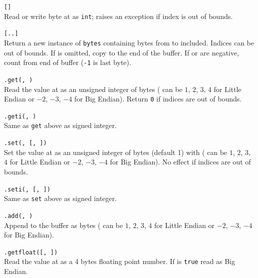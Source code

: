 \hangpar {}\texttt{[}\texttt{]} \\
Read or write byte at  as \texttt{int}; raises an exception if index is out of bounds.

\hangpar {}\texttt{[}\texttt{..}\texttt{]} \\
Return a new instance of \texttt{bytes} containing bytes from  to  included. Indices can be out of bounds. If  is omitted, copy to the end of the buffer. If  or  are negative, count from end of buffer (\texttt{-1} is last byte).

\hangpar {}\texttt{.get(}\texttt{, }\texttt{)} \\
Read the value at  as an unsigned integer of  bytes ( can be $1$, $2$, $3$, $4$ for Little Endian or $-2$, $-3$, $-4$ for Big Endian). Return \texttt{0} if indices are out of bounds.

\hangpar {}\texttt{.geti(}\texttt{, }\texttt{)} \\
Same as \texttt{get} above as signed integer.

\hangpar {}\texttt{.set(}\texttt{, }\texttt{[, }\texttt{])} \\
Set the value at  as an unsigned integer of  bytes (default 1) with  ( can be $1$, $2$, $3$, $4$ for Little Endian or $-2$, $-3$, $-4$ for Big Endian). No effect if indices are out of bounds.

\hangpar {}\texttt{.seti(}\texttt{, }\texttt{[, }\texttt{])} \\
Same as \texttt{set} above as signed integer.

\hangpar {}\texttt{.add(}\texttt{, }\texttt{)} \\
Append  to the  buffer as  bytes ( can be $1$, $2$, $3$, $4$ for Little Endian or $-2$, $-3$, $-4$ for Big Endian).

\hangpar {}\texttt{.getfloat(}\texttt{[, }\texttt{])} \\
Read the value at  as a 4 bytes floating point number. If  is \texttt{true} read as Big Endian.

